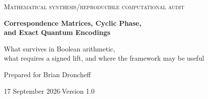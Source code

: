 \begin{titlepage}
\centering
\vspace*{11mm}
{\small\scshape Mathematical synthesis\quad /\quad reproducible computational audit\par}
\vspace{12mm}
{\LARGE\bfseries Correspondence Matrices, Cyclic Phase,\\[5pt] and Exact Quantum Encodings\par}
\vspace{6mm}
{\large What survives in Boolean arithmetic,\\what requires a signed lift, and where the framework may be useful\par}
\vspace{12mm}
{\large Prepared for Brian Droncheff\par}
\vspace{3mm}
{17 September 2026\quad $\cdot$\quad Version 1.0\par}
\vspace{12mm}
\begin{minipage}{0.91\textwidth}
\begin{abstract}
This paper consolidates and audits an exploration beginning with Droncheff's correspondence matrices (CMs), which encode two-input Boolean predicates as binary $2\times2$ arrays. Clockwise rotation supplies a faithful $C_4$ action on the four atomic CM features. With an explicitly added cyclic-convolution product, these arrays form $\F_2[C_4]$. XOR cancellation, rotational correlations, and a conditional uniqueness theorem for normalized Hamming measure are established. Fresh exhaustive checks of all $65{,}536$ two-branch operators confirm that global Hamming and full integer-correlation preservation leave only $32$ phase-permutation operators. Thus these particular Boolean metrics do not provide a Hadamard-like mixer.


\end{abstract}
\end{minipage}
\end{titlepage}
